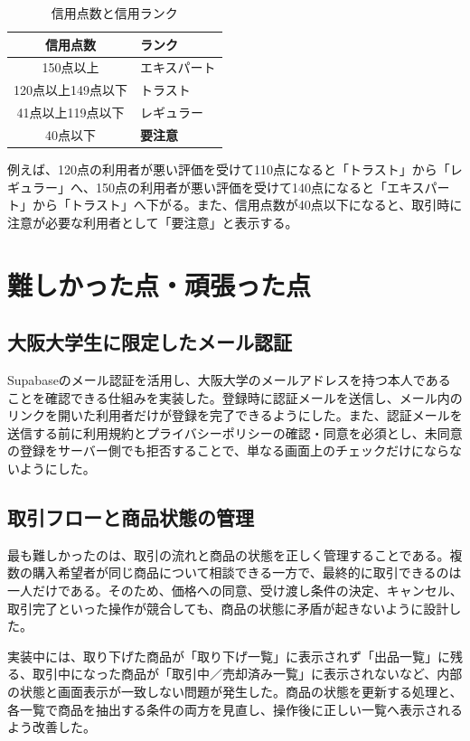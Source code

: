 \documentclass[11pt,a4paper]{article}
\begin{document}
\begin{table}[htbp]
  \centering
  \caption{信用点数と信用ランク}
  \begin{tabular}{cl}
    \toprule
    信用点数 & ランク\\
    \midrule
    150点以上 & エキスパート\\
    120点以上149点以下 & トラスト\\
    41点以上119点以下 & レギュラー\\
    40点以下 & \textcolor{warningred}{\textbf{要注意}}\\
    \bottomrule
  \end{tabular}
\end{table}

例えば、120点の利用者が悪い評価を受けて110点になると「トラスト」から「レギュラー」へ、150点の利用者が悪い評価を受けて140点になると「エキスパート」から「トラスト」へ下がる。また、信用点数が40点以下になると、取引時に注意が必要な利用者として「要注意」と表示する。

\section{難しかった点・頑張った点}

\subsection{大阪大学生に限定したメール認証}

Supabaseのメール認証を活用し、大阪大学のメールアドレスを持つ本人であることを確認できる仕組みを実装した。登録時に認証メールを送信し、メール内のリンクを開いた利用者だけが登録を完了できるようにした。また、認証メールを送信する前に利用規約とプライバシーポリシーの確認・同意を必須とし、未同意の登録をサーバー側でも拒否することで、単なる画面上のチェックだけにならないようにした。

\subsection{取引フローと商品状態の管理}

最も難しかったのは、取引の流れと商品の状態を正しく管理することである。複数の購入希望者が同じ商品について相談できる一方で、最終的に取引できるのは一人だけである。そのため、価格への同意、受け渡し条件の決定、キャンセル、取引完了といった操作が競合しても、商品の状態に矛盾が起きないように設計した。

実装中には、取り下げた商品が「取り下げ一覧」に表示されず「出品一覧」に残る、取引中になった商品が「取引中／売却済み一覧」に表示されないなど、内部の状態と画面表示が一致しない問題が発生した。商品の状態を更新する処理と、各一覧で商品を抽出する条件の両方を見直し、操作後に正しい一覧へ表示されるよう改善した。
\end{document}
